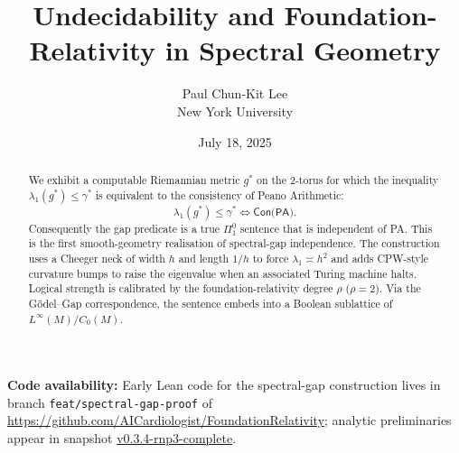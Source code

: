 \documentclass[11pt]{article}
\newcommand{\leanRepoTag}{%
  \href{https://github.com/AICardiologist/FoundationRelativity/tree/v0.3.4-rnp3-complete}%
       {v0.3.4-rnp3-complete}}
\theoremstyle{definition}\newtheorem{definition}[theorem]{Definition}
\theoremstyle{remark}\newtheorem{remark}[theorem]{Remark}
\begin{document}
\title{Undecidability and Foundation-Relativity in Spectral Geometry}
\author{Paul Chun-Kit Lee \\[0.3em] \small New York University}
\date{July 18, 2025}

\maketitle
\thispagestyle{empty}

\begin{abstract}
We exhibit a computable Riemannian metric $g^{\ast}$ on the 2-torus for
which the inequality $\lambda_{1}(g^{\ast})\le\gamma^{\ast}$ is
equivalent to the consistency of Peano Arithmetic:
\[
    \lambda_{1}(g^{\ast})\le\gamma^{\ast} \Longleftrightarrow
    \textsf{Con(PA)} .
\]
Consequently the gap predicate is a true $\Pi^{0}_{1}$ sentence that is
independent of PA. This is the first smooth-geometry realisation of
spectral-gap independence. The construction uses a Cheeger neck of
width $h$ and length $1/h$ to force $\lambda_{1}\asymp h^{2}$ and
adds CPW-style curvature bumps to raise the eigenvalue when an
associated Turing machine halts. Logical strength is calibrated by the
foundation-relativity degree $\rho$ ($\rho=2$). Via the
Gödel–Gap correspondence, the sentence embeds into a Boolean sublattice
of $L^{\infty}(M)/C_{0}(M)$.
\end{abstract}

\vspace{0.5em}
{\footnotesize \textbf{Code availability:} Early Lean code for the spectral-gap construction lives in branch
\texttt{feat/spectral-gap-proof} of
\url{https://github.com/AICardiologist/FoundationRelativity};
analytic preliminaries appear in snapshot \leanRepoTag.}

\tableofcontents




\end{document}
